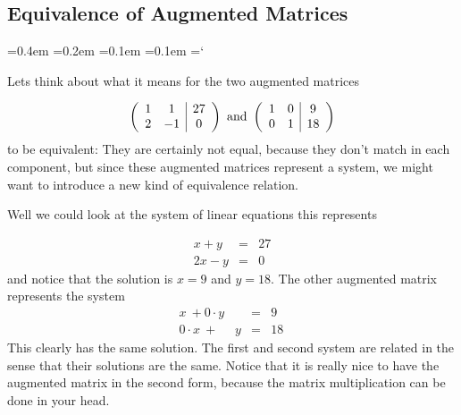 \subsection*{Equivalence of Augmented Matrices}

{\ttfamily
{}\font=0.4em
\font=0.2em
\font=0.1em
\font=0.1em
\hyphenchar\font=`\-


\hypertarget{script_gaussian_elimination_background}{Lets think about what it means for the two augmented matrices} 


$$ \left( \begin{array}{cc | c}
1 & 1 & 27 \\
2 & -1 & 0  
\end{array} \right)
\mbox{ and } \left( \begin{array}{cc | c}
1 & 0 & 9 \\
0 & 1 & 18  
\end{array} \right)
$$
to be equivalent:
They are certainly not equal, because they don't match in each component, but since these augmented matrices represent a system, we might want to introduce a new kind of equivalence relation.

Well we could look at the system of linear equations this represents 

\begin{eqnarray*}
 x+y &=& 27\\
 2x - y &=& 0\, 
\end{eqnarray*}
and notice that the solution is $x=9$ and $y=18$. The other augmented matrix represents the system 
\begin{eqnarray*}
 x\ +0 \cdot y &=& 9\\
 0 \cdot x \ +\   \phantom{0 \cdot} y  &=& 18\, 
\end{eqnarray*}
This clearly has the same solution. The first and second system are related in the sense that their solutions are the same. Notice that it is really nice to have the augmented matrix in the second form, because the matrix multiplication can be done in your head.


}

